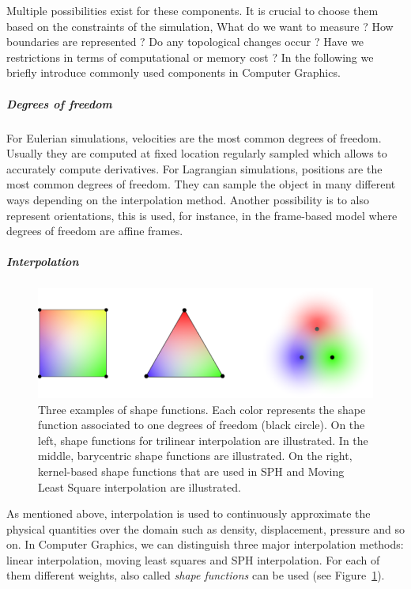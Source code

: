 Multiple possibilities exist for these components. It is crucial to choose them based on the constraints of the simulation, What do we want to measure ? How boundaries are represented ? Do any topological changes occur ? Have we restrictions in terms of computational or memory cost ? In the following we briefly introduce commonly used components in Computer Graphics.

\subparagraph{Degrees of freedom}
For Eulerian simulations, velocities are the most common degrees of freedom. Usually they are computed at fixed location regularly sampled which allows to accurately compute derivatives. For Lagrangian simulations, positions are the most common degrees of freedom. They can sample the object in many different ways depending on the interpolation method. Another possibility is to also represent orientations, this is used, for instance, in the frame-based model where degrees of freedom are affine frames.

\subparagraph{Interpolation}

\begin{figure}[!ht]
\centering
\includegraphics[scale=0.5]{images/continuum_mechanics/shapefunction.png}
\caption[STAR mechanics: Shape functions]{\label{fig:shapefunction} Three examples of shape functions. Each color represents the shape function associated to one degrees of freedom (black circle). On the left, shape functions for trilinear interpolation are illustrated. In the middle, barycentric shape functions are illustrated. On the right, kernel-based shape functions that are used in SPH and Moving Least Square interpolation are illustrated.}
\end{figure}

As mentioned above, interpolation is used to continuously approximate the physical quantities over the domain such as density, displacement, pressure and so on. In Computer Graphics, we can distinguish three major interpolation methods: linear interpolation, moving least squares and SPH interpolation. For each of them different weights, also called \emph{shape functions} can be used (see Figure~\ref{fig:shapefunction}). 

